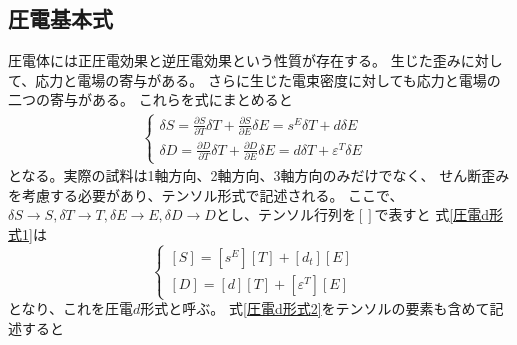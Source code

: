\documentclass[dvipdfmx,12pt,a4paper]{jreport}
\begin{document}
		\subsection{圧電基本式}
		圧電体には正圧電効果と逆圧電効果という性質が存在する。
		生じた歪みに対して、応力と電場の寄与がある。
		さらに生じた電束密度に対しても応力と電場の二つの寄与がある。
		これらを式にまとめると
				\begin{eqnarray}
					\begin{cases}
						\delta S=\frac{\partial S}{\partial T}\delta T + \frac{\partial S}{\partial E} \delta E 
						= s^{E}\delta T+d \delta E & \\
						\delta D=\frac{\partial D}{\partial T}\delta T + \frac{\partial D}{\partial E}\delta E 
						= d \delta T+\varepsilon^T \delta E  &
					\end{cases}
					\label{圧電d形式1}
				\end{eqnarray}
			となる。実際の試料は1軸方向、2軸方向、3軸方向のみだけでなく、
			せん断歪みを考慮する必要があり、テンソル形式で記述される。
			ここで、$\delta S\rightarrow S, \delta T\rightarrow T,
			\delta E\rightarrow E, \delta D\rightarrow D$とし、テンソル行列を$\left[　\right]$で表すと
			式\eqref{圧電d形式1}は
			\begin{equation}
				\begin{cases}
					\left[S\right]=\left[s^E\right]\left[T\right]+\left[d_t\right]\left[E\right]& \\
					\left[D\right]=\left[d\right]\left[T\right]+\left[\varepsilon^T\right]\left[E\right]
				\end{cases}
				\label{圧電d形式2}
			\end{equation}
			となり、これを圧電$d$形式と呼ぶ。
			式\eqref{圧電d形式2}をテンソルの要素も含めて記述すると
\end{document}
